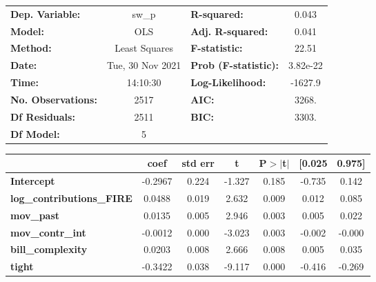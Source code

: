 \begin{center}
\begin{tabular}{lclc}
\toprule
\textbf{Dep. Variable:}           &      sw\_p       & \textbf{  R-squared:         } &     0.043   \\
\textbf{Model:}                   &       OLS        & \textbf{  Adj. R-squared:    } &     0.041   \\
\textbf{Method:}                  &  Least Squares   & \textbf{  F-statistic:       } &     22.51   \\
\textbf{Date:}                    & Tue, 30 Nov 2021 & \textbf{  Prob (F-statistic):} &  3.82e-22   \\
\textbf{Time:}                    &     14:10:30     & \textbf{  Log-Likelihood:    } &   -1627.9   \\
\textbf{No. Observations:}        &        2517      & \textbf{  AIC:               } &     3268.   \\
\textbf{Df Residuals:}            &        2511      & \textbf{  BIC:               } &     3303.   \\
\textbf{Df Model:}                &           5      & \textbf{                     } &             \\
\bottomrule
\end{tabular}
\begin{tabular}{lcccccc}
                                  & \textbf{coef} & \textbf{std err} & \textbf{t} & \textbf{P$> |$t$|$} & \textbf{[0.025} & \textbf{0.975]}  \\
\midrule
\textbf{Intercept}                &      -0.2967  &        0.224     &    -1.327  &         0.185        &       -0.735    &        0.142     \\
\textbf{log\_contributions\_FIRE} &       0.0488  &        0.019     &     2.632  &         0.009        &        0.012    &        0.085     \\
\textbf{mov\_past}                &       0.0135  &        0.005     &     2.946  &         0.003        &        0.005    &        0.022     \\
\textbf{mov\_contr\_int}          &      -0.0012  &        0.000     &    -3.023  &         0.003        &       -0.002    &       -0.000     \\
\textbf{bill\_complexity}         &       0.0203  &        0.008     &     2.666  &         0.008        &        0.005    &        0.035     \\
\textbf{tight}                    &      -0.3422  &        0.038     &    -9.117  &         0.000        &       -0.416    &       -0.269     \\

\end{tabular}
\end{center}
